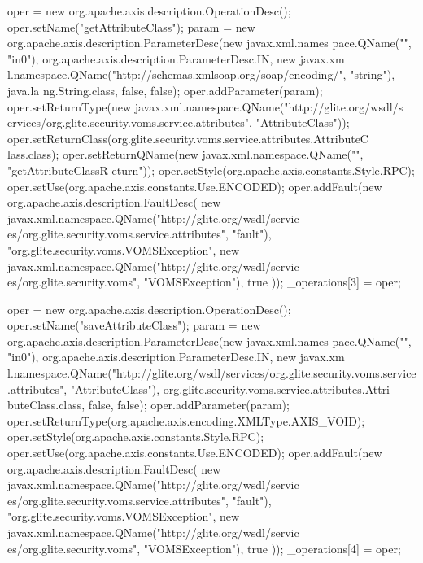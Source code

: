 \begin{DoxyCode}
{        oper = new org.apache.axis.description.OperationDesc();
        oper.setName("getAttributeClass");
        param = new org.apache.axis.description.ParameterDesc(new javax.xml.names
      pace.QName("", "in0"), org.apache.axis.description.ParameterDesc.IN, new javax.xm
      l.namespace.QName("http://schemas.xmlsoap.org/soap/encoding/", "string"), java.la
      ng.String.class, false, false);
        oper.addParameter(param);
        oper.setReturnType(new javax.xml.namespace.QName("http://glite.org/wsdl/s
      ervices/org.glite.security.voms.service.attributes", "AttributeClass"));
        oper.setReturnClass(org.glite.security.voms.service.attributes.AttributeC
      lass.class);
        oper.setReturnQName(new javax.xml.namespace.QName("", "getAttributeClassR
      eturn"));
        oper.setStyle(org.apache.axis.constants.Style.RPC);
        oper.setUse(org.apache.axis.constants.Use.ENCODED);
        oper.addFault(new org.apache.axis.description.FaultDesc(
                      new javax.xml.namespace.QName("http://glite.org/wsdl/servic
      es/org.glite.security.voms.service.attributes", "fault"),
                      "org.glite.security.voms.VOMSException",
                      new javax.xml.namespace.QName("http://glite.org/wsdl/servic
      es/org.glite.security.voms", "VOMSException"), 
                      true
                     ));
        _operations[3] = oper;

        oper = new org.apache.axis.description.OperationDesc();
        oper.setName("saveAttributeClass");
        param = new org.apache.axis.description.ParameterDesc(new javax.xml.names
      pace.QName("", "in0"), org.apache.axis.description.ParameterDesc.IN, new javax.xm
      l.namespace.QName("http://glite.org/wsdl/services/org.glite.security.voms.service
      .attributes", "AttributeClass"), org.glite.security.voms.service.attributes.Attri
      buteClass.class, false, false);
        oper.addParameter(param);
        oper.setReturnType(org.apache.axis.encoding.XMLType.AXIS_VOID);
        oper.setStyle(org.apache.axis.constants.Style.RPC);
        oper.setUse(org.apache.axis.constants.Use.ENCODED);
        oper.addFault(new org.apache.axis.description.FaultDesc(
                      new javax.xml.namespace.QName("http://glite.org/wsdl/servic
      es/org.glite.security.voms.service.attributes", "fault"),
                      "org.glite.security.voms.VOMSException",
                      new javax.xml.namespace.QName("http://glite.org/wsdl/servic
      es/org.glite.security.voms", "VOMSException"), 
                      true
                     ));
        _operations[4] = oper;

}
\end{DoxyCode}
